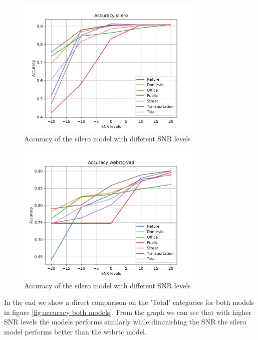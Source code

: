 \documentclass[../main.tex]{subfiles}
\begin{document}
\begin{figure}[ht]
    \centering
    \includegraphics[width=0.8\textwidth]{images/Accuracy silero.png}
    \caption{Accuracy of the silero model with different SNR levels}
    \label{fig:accuracy silero}
\end{figure}

\begin{figure}[ht]
    \centering
    \includegraphics[width=0.8\textwidth]{images/Accuracy webrtc-vad.png}
    \caption{Accuracy of the silero model with different SNR levels}
    \label{fig:accuracy webrtc}
\end{figure}

In the end we show a direct comparison on the 'Total' categories for both models in figure \ref{fig:accuracy both models}. From the graph we can see that with higher SNR levels the models performs similarly while diminishing the SNR the silero model performs better than the webrtc model.
\end{document}
